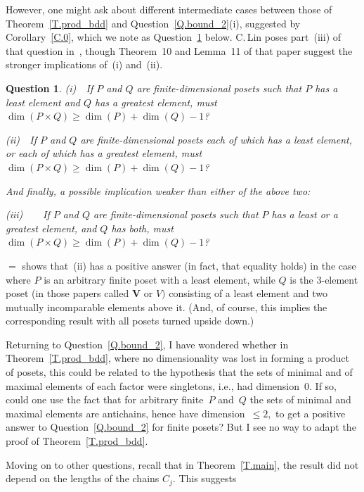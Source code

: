 \documentclass{amsart}
\newtheorem{question}[theorem]{Question}
\numberwithin{equation}{section}
\numberwithin{theorem}{section}
\newcommand{\2}{\mathbf{2}}
\begin{document}
However, one might ask about different intermediate cases
between those of Theorem~\ref{T.prod_bdd} and
Question~\ref{Q.bound_2}(i),
suggested by Corollary~\ref{C.0}, which we note as
Question~\ref{Q.bound_1} below.
C.\,Lin poses part~(iii) of that question
in~\cite{lin}, though Theorem~10 and Lemma~11 of that paper
suggest the stronger implications of~(i) and~(ii).

\begin{question}\label{Q.bound_1}
\textup{(i)}~~If $P$ and $Q$ are finite-dimensional posets
such that $P$ has a least element and
$Q$ has a greatest element,
must $\dim(P\times Q)\geq \dim(P)+\dim(Q)-1$?

\textup{(ii)}~~If $P$ and $Q$ are finite-dimensional posets
each of which has a least element,
or each of which has a greatest element,
must $\dim(P\times Q)\geq \dim(P)+\dim(Q)-1$?

And finally, a possible implication weaker than either of the above two:

\textup{(iii)}~~\cite[p.80]{lin}~~If $P$ and $Q$ are
finite-dimensional posets such that $P$ has a least or a
greatest element, and $Q$ has both,
must $\dim(P\times Q)\geq \dim(P)+\dim(Q)-1$?
\end{question}

\cite[Theorem~$3'$]{KR90}$=$\cite[Theorem~10]{F+T+W} shows
that~(ii) has a positive answer (in fact, that equality holds)
in the case where $P$ is an arbitrary finite poset with a least
element, while $Q$ is the $\!3\!$-element poset (in those
papers called $\mathbf{V}$ or $V)$ consisting of a least element and
two mutually incomparable elements above it.
(And, of course, this implies the corresponding
result with all posets turned upside down.)

Returning to Question~\ref{Q.bound_2}, I have wondered whether
in Theorem~\ref{T.prod_bdd}, where no dimensionality
was lost in forming a product of posets, this could be related to the
hypothesis that the sets of minimal and of maximal elements of each
factor were singletons, i.e., had dimension~$0.$
If so, could one use the fact that for arbitrary finite~$P$
and~$Q$ the sets of minimal and maximal
elements are antichains, hence have dimension~$\leq 2,$
to get a positive answer to Question~\ref{Q.bound_2} for
finite posets?
But I see no way to adapt the proof of Theorem~\ref{T.prod_bdd}.

Moving on to other questions, recall that
in Theorem~\ref{T.main}, the result did not depend on
the lengths of the chains $C_j.$
This suggests
\end{document}
